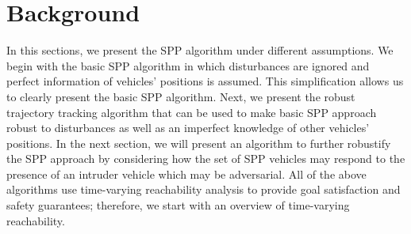 \section{Background \label{sec:background}}
In this sections, we present the SPP algorithm under different assumptions. We begin with the basic SPP algorithm in which disturbances are ignored and perfect information of vehicles' positions is assumed. This simplification allows us to clearly present the basic SPP algorithm. Next, we present the robust trajectory tracking algorithm that can be used to make basic SPP approach robust to disturbances as well as an imperfect knowledge of other vehicles' positions. In the next section, we will present an algorithm to further robustify the SPP approach by considering how the set of SPP vehicles may respond to the presence of an intruder vehicle which may be adversarial. All of the above algorithms use time-varying reachability analysis to provide goal satisfaction and safety guarantees; therefore, we start with an overview of time-varying reachability.

